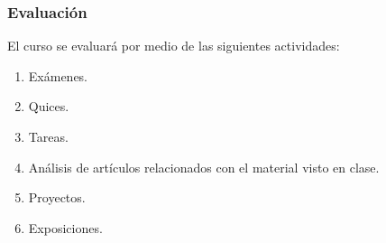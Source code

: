 \begin{refsection}
\begin{enumerate}
\end{enumerate}

\subsubsection*{Evaluación}

El curso se evaluará por medio de las siguientes actividades:

\begin{enumerate}
\item Exámenes.
\item Quices.
\item Tareas.
\item Análisis de artículos relacionados con el material visto en clase.
\item Proyectos.
\item Exposiciones.
\end{enumerate}

\nocite{Bog20}
\nocite{BBT08}
\nocite{Fol99}
\nocite{Lie01}
\nocite{RF10}
\nocite{SS05}
\nocite{Vil03}

\printcursosbibliography
\end{refsection}

